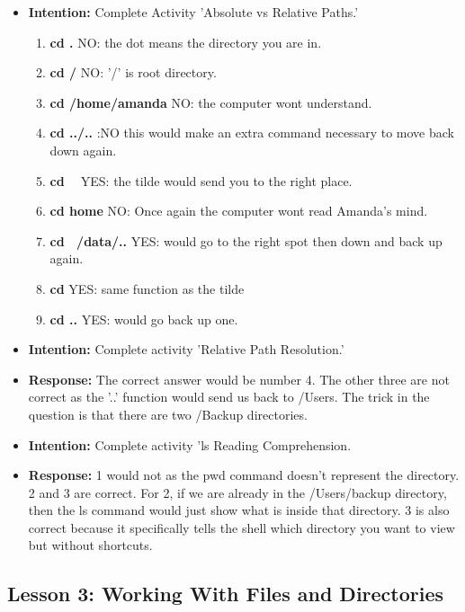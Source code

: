 \documentclass{article}
\begin{document}
\begin{itemize}
\item{\textbf{Intention:} Complete Activity 'Absolute vs Relative Paths.'}
\begin{enumerate}

\item{\textbf{cd .} NO: the dot means the directory you are in.}
\item{\textbf{cd /} NO: '/' is root directory.}
\item{\textbf{cd /home/amanda} NO: the computer wont understand.}
\item{\textbf{cd ../..} :NO this would make an extra command necessary to move back down again.}
\item{\textbf{cd ~} YES: the tilde would send you to the right place.}
\item{\textbf{cd home} NO: Once again the computer wont read Amanda's mind.}
\item{\textbf{cd ~/data/..} YES: would go to the right spot then down and back up again.}
\item{\textbf{cd} YES: same function as the tilde}
\item{\textbf{cd ..} YES: would go back up one.}


\end{enumerate}
\end{itemize}

\begin{itemize}
\item{\textbf{Intention:} Complete activity 'Relative Path Resolution.' }
\item{\textbf{Response:} The correct answer would be number 4. The other three are not correct as the '..' function would send us back to /Users. The trick in the question is that there are two /Backup directories.}

\item{\textbf{Intention:} Complete activity 'ls Reading Comprehension.}
\item{\textbf{Response:} 1 would not as the pwd command doesn't represent the directory. 2 and 3 are correct. For 2, if we are already in the /Users/backup directory, then the ls command would just show what is inside that directory. 3 is also correct because it specifically tells the shell which directory you want to view but without shortcuts.}

\end{itemize}

\subsection{ Lesson 3: Working With Files and Directories}
\end{document}
